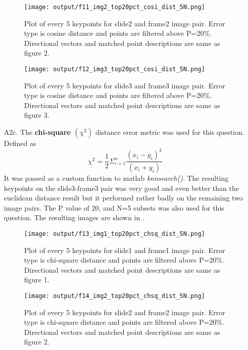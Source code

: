 \documentclass[12pt]{report}
\begin{document}
\begin{enumerate}
    \begin{figure}[H]
        \centering
        \texttt{[image: output/f11\_img2\_top20pct\_cosi\_dist\_5N.png]}
        \caption{Plot of every 5 keypoints for slide2 and frame2 image pair. Error type is cosine distance and points are filtered above P=20\%. Directional 
        vectors and matched point descriptions are same as figure 2.}
        \label{fig:Figure11}
    \end{figure}

    \begin{figure}[H]
        \centering
        \texttt{[image: output/f12\_img3\_top20pct\_cosi\_dist\_5N.png]}
        \caption{Plot of every 5 keypoints for slide3 and frame3 image pair. Error type is cosine distance and points are filtered above P=20\%. Directional 
        vectors and matched point descriptions are same as figure 3.}
        \label{fig:Figure12}
    \end{figure}

    \item[A2c.] The \textbf{chi-square $(\chi^2)$} distance error metric was used for this question. Defined as 
    \[
    \chi^2 = \frac{1}{2} \Sigma^n_{i=1} \frac{(x_i - y_i)^2}{(x_i + y_i)}
    \]
    It was passed as a custom function to matlab \emph{knnsearch()}. The resulting keypoints on the slide3-frame3 pair was very good and even better than the euclidean 
    distance result but it performed rather badly on the remaining two image pairs. The P value of 20, and N=5 subsets was also used for this question. The resulting 
    images are shown in .

    \begin{figure}[H]
        \centering
        \texttt{[image: output/f13\_img1\_top20pct\_chsq\_dist\_5N.png]}
        \caption{Plot of every 5 keypoints for slide1 and frame1 image pair. Error type is chi-square distance and points are filtered above P=20\%. Directional 
        vectors and matched point descriptions are same as figure 1.}
        \label{fig:Figure13}
    \end{figure}

    \begin{figure}[H]
        \centering
        \texttt{[image: output/f14\_img2\_top20pct\_chsq\_dist\_5N.png]}
        \caption{Plot of every 5 keypoints for slide2 and frame2 image pair. Error type is chi-square distance and points are filtered above P=20\%. Directional 
        vectors and matched point descriptions are same as figure 2.}
        \label{fig:Figure14}
    \end{figure}


\end{enumerate}
\end{document}
